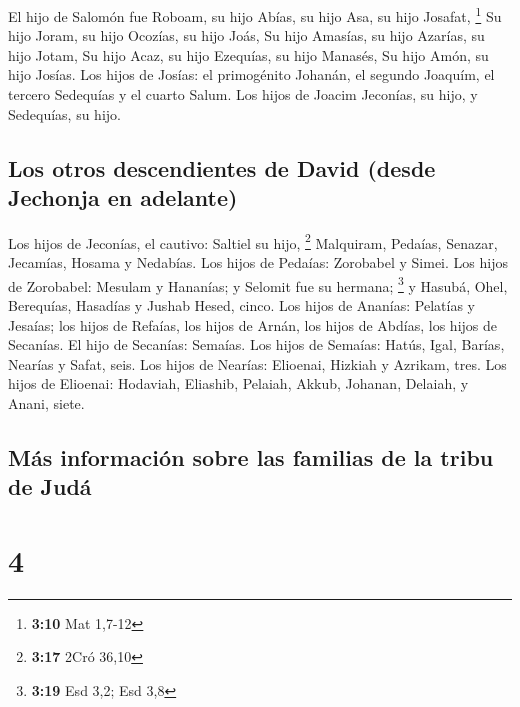  El hijo de Salomón fue Roboam, su hijo Abías, su hijo
Asa, su hijo Josafat, \footnote{\textbf{3:10} Mat 1,7-12}
 Su hijo Joram, su hijo Ocozías, su hijo Joás,
 Su hijo Amasías, su hijo Azarías, su hijo Jotam,
 Su hijo Acaz, su hijo Ezequías, su hijo Manasés,
 Su hijo Amón, su hijo Josías.  Los hijos
de Josías: el primogénito Johanán, el segundo Joaquím, el tercero
Sedequías y el cuarto Salum.  Los hijos de Joacim
Jeconías, su hijo, y Sedequías, su hijo.

\hypertarget{los-otros-descendientes-de-david-desde-jechonja-en-adelante}{%
\subsection{Los otros descendientes de David (desde Jechonja en
adelante)}\label{los-otros-descendientes-de-david-desde-jechonja-en-adelante}}

 Los hijos de Jeconías, el cautivo: Saltiel su hijo,
\footnote{\textbf{3:17} 2Cró 36,10}  Malquiram, Pedaías,
Senazar, Jecamías, Hosama y Nedabías.  Los hijos de
Pedaías: Zorobabel y Simei. Los hijos de Zorobabel: Mesulam y Hananías;
y Selomit fue su hermana; \footnote{\textbf{3:19} Esd 3,2; Esd 3,8}
 y Hasubá, Ohel, Berequías, Hasadías y Jushab Hesed,
cinco.  Los hijos de Ananías: Pelatías y Jesaías; los
hijos de Refaías, los hijos de Arnán, los hijos de Abdías, los hijos de
Secanías.  El hijo de Secanías: Semaías. Los hijos de
Semaías: Hatús, Igal, Barías, Nearías y Safat, seis.  Los
hijos de Nearías: Elioenai, Hizkiah y Azrikam, tres.  Los
hijos de Elioenai: Hodaviah, Eliashib, Pelaiah, Akkub, Johanan, Delaiah,
y Anani, siete.

\hypertarget{muxe1s-informaciuxf3n-sobre-las-familias-de-la-tribu-de-juduxe1}{%
\subsection{Más información sobre las familias de la tribu de
Judá}\label{muxe1s-informaciuxf3n-sobre-las-familias-de-la-tribu-de-juduxe1}}

\hypertarget{section-3}{%
\section{4}\label{section-3}}

